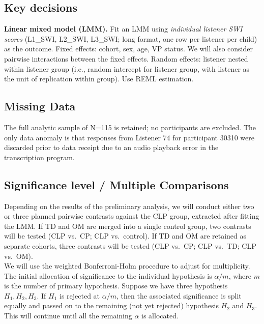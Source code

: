 \documentclass{article}
\begin{document}
\subsection*{Key decisions}\label{sec:primary-decisions}

\textbf{Linear mixed model (LMM).} Fit an LMM using \textit{individual listener SWI scores} (L1\_SWI, L2\_SWI, L3\_SWI; long format, one row per listener per child) as the outcome. Fixed effects: cohort, sex, age, VP status. We will also consider pairwise interactions between the fixed effects. Random effects: listener nested within listener group (i.e., random intercept for listener group, with listener as the unit of replication within group). Use REML estimation. 

\subsection*{Missing Data}\label{sec:missing}
The full analytic sample of N=115 is retained; no participants are excluded. 
The only data anomaly is that responses from Listener 74 for participant 30310 
were discarded prior to data receipt due to an audio playback error in the 
transcription program. 


\subsection*{Significance level / Multiple Comparisons}\label{sec:significance}

Depending on the results of the preliminary analysis, we will conduct either two or three planned pairwise contrasts against the CLP group, extracted after fitting the LMM. If TD and OM are merged into a single control group, two contrasts will be tested (CLP vs.\ CP; CLP vs.\ control). If TD and OM are retained as separate cohorts, three contrasts will be tested (CLP vs.\ CP; CLP vs.\ TD; CLP vs.\ OM).  \\

\noindent We will use the weighted Bonferroni-Holm procedure to adjust for multiplicity. The initial allocation of significance to the individual hypothesis is $\alpha/m$, where $m$ is the number of primary hypothesis. Suppose we have three hypothesis $H_1, H_2, H_3$. If $H_1$ is rejected at $\alpha/m$, then the associated significance is split equally and passed on to the remaining (not yet rejected) hypothesis $H_2$ and $H_3$. This will continue until all the remaining $\alpha$ is allocated. \\ 
\end{document}
